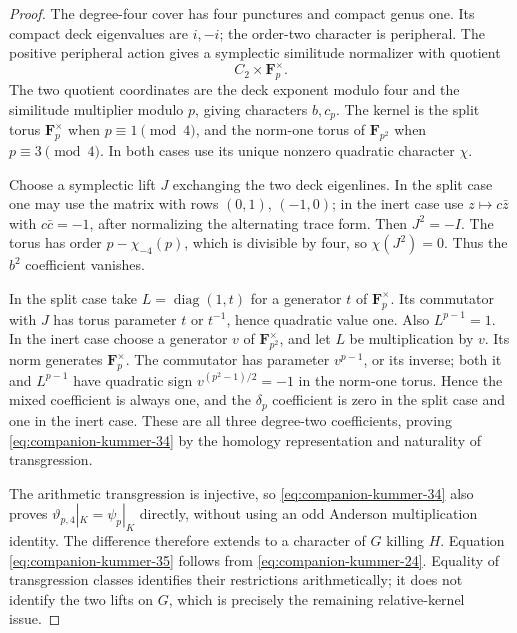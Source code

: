 \begin{proof}
The degree-four cover has four punctures and compact genus one.
Its compact deck eigenvalues are \(i,-i\); the order-two
character is peripheral. The positive peripheral action gives
a symplectic similitude normalizer with quotient
\[
                         C_2\times\mathbf F_p^\times.
\]
The two quotient coordinates are the deck exponent modulo four
and the similitude multiplier modulo \(p\), giving characters
\(b,c_p\). The kernel is the split torus \(\mathbf F_p^\times\)
when \(p\equiv1\pmod4\), and the norm-one torus of
\(\mathbf F_{p^2}\) when \(p\equiv3\pmod4\). In both cases
use its unique nonzero quadratic character \(\chi\).

Choose a symplectic lift \(J\) exchanging the two deck eigenlines.
In the split case one may use the matrix with rows \((0,1)\),
\((-1,0)\); in the inert case use \(z\mapsto c\bar z\)
with \(c\bar c=-1\), after normalizing the alternating trace form.
Then \(J^2=-I\). The torus has order \(p-\chi_{-4}(p)\),
which is divisible by four, so \(\chi(J^2)=0\).
Thus the \(b^2\) coefficient vanishes.

In the split case take \(L=\operatorname{diag}(1,t)\) for a
generator \(t\) of \(\mathbf F_p^\times\). Its commutator
with \(J\) has torus parameter \(t\) or \(t^{-1}\), hence
quadratic value one. Also \(L^{p-1}=1\).
In the inert case choose a generator \(v\) of
\(\mathbf F_{p^2}^\times\), and let \(L\) be multiplication
by \(v\). Its norm generates \(\mathbf F_p^\times\).
The commutator has parameter \(v^{p-1}\), or its inverse;
both it and \(L^{p-1}\) have quadratic sign
\(v^{(p^2-1)/2}=-1\) in the norm-one torus.
Hence the mixed coefficient is always one,
and the \(\delta_p\) coefficient is zero in the split case
and one in the inert case. These are all three degree-two
coefficients, proving \eqref{eq:companion-kummer-34} by the homology representation
and naturality of transgression.

The arithmetic transgression is injective, so \eqref{eq:companion-kummer-34} also proves
\(\vartheta_{p,4}|_{K}=\psi_p|_{K}\) directly, without
using an odd Anderson multiplication identity. The difference
therefore extends to a character of \(G\) killing \(H\).
Equation \eqref{eq:companion-kummer-35} follows from \eqref{eq:companion-kummer-24}. Equality of transgression
classes identifies their restrictions arithmetically; it does
not identify the two lifts on \(G\), which is precisely the
remaining relative-kernel issue.
\end{proof}

